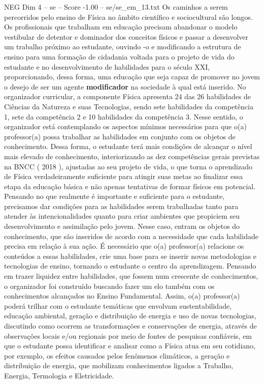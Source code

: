 \begin{textsample}{NEG Dim 4 – se – Score -1.00 – se/se\_em\_13.txt}
Os caminhos a serem percorridos pelo ensino de Física no âmbito científico e sociocultural são longos.
Os profissionais que trabalham em educação precisam abandonar o modelo vestibular de detentor e dominador dos conceitos físicos e passar a desenvolver um trabalho próximo ao estudante, ouvindo -o e modificando a estrutura de ensino para uma formação de cidadania voltada para o projeto de vida do estudante e no desenvolvimento de habilidades para o século XXI, proporcionando, dessa forma, uma educação que seja capaz de promover no jovem o desejo de ser um agente \textbf{modificador} na sociedade à qual está inserido.
No organizador curricular, a componente Física apresenta 24 das 26 habilidades de Ciências da Natureza e suas Tecnologias, sendo sete habilidades da competência 1, sete da competência 2 e 10 habilidades da competência 3.
Nesse sentido, o organizador está contemplando os aspectos mínimos necessários para que o(a) professor(a) possa trabalhar as habilidades em conjunto com os objetos de conhecimento.
Dessa forma, o estudante terá mais condições de alcançar o nível mais elevado de conhecimento, interiorizando as dez competências gerais previstas na BNCC ( 2018 ), ajustadas ao seu projeto de vida, o que torna o aprendizado de Física verdadeiramente suficiente para atingir suas metas ao finalizar essa etapa da educação básica e não apenas tentativas de formar físicos em potencial.
Pensando no que realmente é importante e suficiente para o estudante, precisamos dar condições para as habilidades serem trabalhadas tanto para atender às intencionalidades quanto para criar ambientes que propiciem seu desenvolvimento e assimilação pelo jovem.
Nesse caso, entram os objetos do conhecimento, que são inseridos de acordo com a necessidade que cada habilidade precisa em relação à sua ação.
É necessário que o(a) professor(a) relacione os conteúdos a essas habilidades, crie uma base para se inserir novas metodologias e tecnologias de ensino, tornando o estudante o centro da aprendizagem.
Pensando em trazer liquidez entre habilidades, que fossem num crescente de conhecimentos, o organizador foi construído buscando fazer um elo também com os conhecimentos alcançados no Ensino Fundamental.
Assim, o(a) professor(a) poderá trilhar com o estudante temáticas que envolvam sustentabilidade, educação ambiental, geração e distribuição de energia e uso de novas tecnologias, discutindo como ocorrem as transformações e conservações de energia, através de observações locais e/ou regionais por meio de fontes de pesquisas confiáveis, em que o estudante possa identificar e analisar como a Física atua em seu cotidiano, por exemplo, os efeitos causados pelos fenômenos climáticos, a geração e distribuição de energia, que mobilizam conhecimentos ligados a Trabalho, Energia, Termologia e Eletricidade.

\end{textsample}
